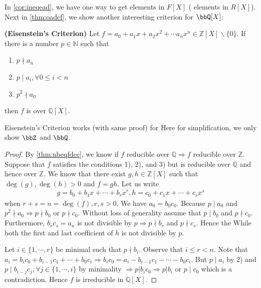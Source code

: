 \documentclass{article}
\newcommand{\bfs}[1]{\textbf{({#1}) }}
\begin{document}
In \cref{cor:ineqead}, we have one way to get  elements in $F[X]$ ( elements in $R[X]$). Next in \cref{thm:oadcf}, we show another interesting criterion for  $\bbQ[X]$:
\begin{thma}\bfs{Eisenstein's Criterion} \label{thm:oadcf}
Let $f=a_{0}+a_{1} x+a_{2} x^{2}+\cdots a_{n} x^{n} \in \mathbb{Z}[X] \backslash\{0\}$. If there is a  number $p \in \mathbb{N}$ such that
\begin{enumerate}[1)]
    \item $p \nmid a_{n}$
    \item $p \mid a_{i}, \forall 0 \leq i<n$
    \item  $p^{2} \nmid a_{0}$
\end{enumerate}
then $f$ is  over $\mathbb{Q}[X]$.
\end{thma}
\begin{rema}
 Eisenstein's Criterion works (with same proof) for  Here for simplification, we only show $\bbZ$ and $\bbQ$.
\end{rema}
\begin{proof}
By \cref{thm:nbeqfdcc}, we know if $f$ reducible over $\mathbb{Q} \Rightarrow f$ reducible over $\mathbb{Z}$. Suppose that $f$ satisfies the conditions 1), 2), and 3) but is reducible over $\mathbb{Q}$ and hence over $\mathbb{Z}$.  We know that there exist $g, h \in \mathbb{Z}[X]$ such that $\deg(g), \deg(h)>0$ and $f=g h$. Let us write
\begin{align*}
g=b_{0}+b_{1} x+\cdots+b_{r} x^{r}, h=c_{0}+c_{1} x+\cdots+c_{s} x^{s}
\end{align*}
when $r+s=n=\operatorname{deg}(f), r, s>0$. We have $a_{0}=b_{0} c_{0}$. Because $p \mid a_{0}$ and $p^{2} \nmid  a_{0} \Rightarrow p \nmid b_{0}$ or $p \nmid c_{0}$. Without loss of generality assume that $p \mid b_{0}$ and $p \nmid c_{0}$. Furthermore, $b_{r} c_{s}=a_{n}$ is not divisible by $p \Rightarrow p \nmid b_{r}$ and $p \nmid c_{s}$. Hence the  While both the first and last  coefficient of $h$ is not divisible by $p$.

Let $i \in\{1, \cdots, r\}$ be minimal such that $p \nmid b_{i}$. Observe that $i \leq r<n$. Note that $a_{i}=b_{i} c_{0}+b_{i-1} c_{1}+\cdots+b_{0} c_{i} \Rightarrow b_{i} c_{0}=a_{i}-b_{i-1} c_{1}-\cdots-b_{0} c_{i}$. But $p \mid a_{i}$ by 2) and $p \mid b_{i-j} c_{j} , \forall j \in\{1, \cdots, i\}$ by minimality $\Rightarrow p\left|b_{i} c_{0} \Rightarrow p\right| b_{i}$ or $p \mid c_{0}$ which is a contradiction. Hence $f$ is irreducible in $\mathbb{Q}[X]$.
\end{proof} 
\end{document}
